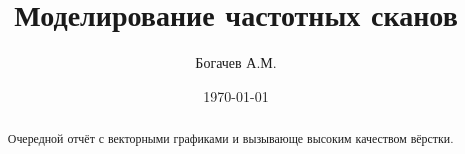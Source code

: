 \documentclass[14pt]{extarticle}
\title{Моделирование частотных сканов}
\author{Богачев А.М.}
\date{\today}
\begin{document}
    \maketitle
    \begin{abstract}
        Очередной отчёт с векторными графиками и вызывающе высоким
        качеством вёрстки.
    \end{abstract}
    \tableofcontents

    \pagebreak

    

    

    

    \pagebreak
    
    \printbibliography[heading=bibintoc]
\end{document}
